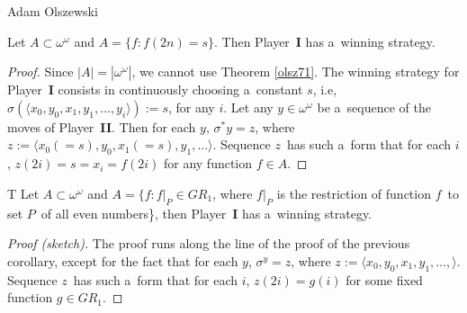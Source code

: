 \begin{artengenv}{Adam Olszewski}
\begin{proposition}
Let $A \subset \omega^{\omega}$ and $A = \{f: f(2n) = s\}$. Then Player~\textbf{I} has a~winning strategy.
\end{proposition}
\begin{proof}
Since $|A| = |\omega^{\omega}|$, we cannot use Theorem \ref{olsz71}. The winning strategy for Player~\textbf{I} consists in continuously choosing a~constant $s$, i.e, $\sigma (\langle x_{0}, y_{0}, x_{1}, y_{1}, \ldots, y_{i} \rangle) := s$, for any $i$. Let any $y\in\omega^{\omega}$ be a~sequence of the moves of Player~\textbf{II}. Then for each $y$, $\sigma^*y = z$, where $z := \langle x_{0}(=s), y_{0}, x_{1}(=s), y_{1}, \ldots \rangle$. Sequence $z$~has such a~form that for each $i$, $z(2i) = s = x_{i} = f(2i)$ for any function $f\in A$.
\end{proof}
%

\begin{customthm}{T}\label{olszT}
Let $A \subset \omega^{\omega}$ and $A = \{f: f |_{P} \in GR_{1}$, where $f |_{P}$ is the restriction of function $f$~to set $P$~of all even numbers\}, then Player~\textbf{I} has a~winning strategy.
\end{customthm}
\begin{proof}[Proof (sketch)]
The proof runs along the line of the proof of the previous corollary, except for the fact that for each $y$, $\sigma^y = z$, where $z := \langle x_{0}, y_{0}, x_{1}, y_{1}, \ldots, \rangle$. Sequence $z$~has such a~form that for each $i$, $z(2i) = g(i)$ for some fixed function $g \in GR_{1}$.
\end{proof}
%


\end{artengenv}
